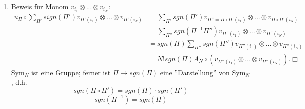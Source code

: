 \documentclass[twoside,a4paper]{scrartcl}
\renewcommand{\1}{\mathds{1}}
\newcommand{\ra}{\rightarrow}
\begin{document}
{\begin{enumerate}
$$=\psi_1\cdot\begin{pmatrix} 1 \\ 0 \end{pmatrix}+\psi_2 \cdot\begin{pmatrix} 0 \\ 1 \end{pmatrix} $$
$\begin{pmatrix} 1 \\ 0 \end{pmatrix}$, $\begin{pmatrix} 0 \\ 1 \end{pmatrix}$ ist eine Basis in $\mathbb C^2$\\
Mit dem Isomorphismus auf den Basisvektoren:
$$\psi_1\begin{pmatrix} 1 \\ 0 \end{pmatrix}+\psi_2\begin{pmatrix} 0 \\ 1 \end{pmatrix} \mapsto \psi_1 \otimes\begin{pmatrix} 1 \\ 0 \end{pmatrix}+\psi_2\otimes \begin{pmatrix} 0 \\ 1 \end{pmatrix}$$
gilt $\psi \in L^2(\mathbb R^3) \otimes \mathbb C^2$ und damit $L^2(\mathbb R^3) \oplus L^2(\mathbb R^3) \cong L^2(\mathbb R^3) \otimes \mathbb C^2$
\item 
Beweis für Monom $v_{i_1} \otimes ... \otimes v_{i_N}$:
\begin{align}
u_\Pi  \circ \sum_{\Pi'} sign(\Pi') v_{\Pi'(i_1)} \otimes ... \otimes v_{\Pi'(i_N)}&= \sum_{\Pi'} sgn(\Pi') v_{\Pi''=\Pi \circ \Pi'(i_1)} \otimes ... \otimes v_{\Pi \circ \Pi'(i_N)} \\
&= \sum_{\Pi''} sgn(\Pi^{-1}\Pi'') v_{\Pi''(i_1)} \otimes ... \otimes v_{\Pi''(i_N)} \\
&= sgn(\Pi) \sum_{\Pi''} sgn(\Pi'') v_{\Pi''(i_1)} \otimes ... \otimes v_{\Pi''(i_N)} \\
&=N! sgn(\Pi) A_N \circ (v_{\Pi''(i_1)} \otimes ... \otimes v_{\Pi''(i_N)}). \Box
\end{align}
Sym$_N$ ist eine Gruppe; ferner ist $\Pi \ra sgn(\Pi)$ eine ''Darstellung'' von Sym$_N$, d.h. 
$$sgn(\Pi \circ \Pi')= sgn(\Pi)\cdot sgn(\Pi')$$
$$sgn(\Pi^{-1})=sgn(\Pi)$$
\end{enumerate}
}{}
\end{document}
